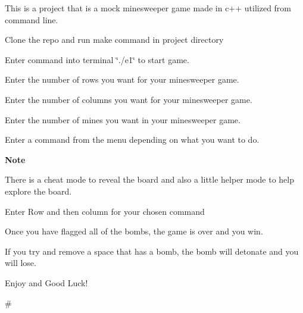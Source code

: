 This is a project that is a mock minesweeper game made in c++ utilized from command line.


\begin{DoxyEnumerate}
\item Clone the repo and run make command in project directory
\item Enter command into terminal \char`\"{}./e1\char`\"{} to start game.
\item Enter the number of rows you want for your minesweeper game.
\item Enter the number of columns you want for your minesweeper game.
\item Enter the number of mines you want in your minesweeper game.
\item Enter a command from the menu depending on what you want to do.
\end{DoxyEnumerate}

{\bfseries Note}

There is a cheat mode to reveal the board and also a little helper mode to help explore the board.


\begin{DoxyEnumerate}
\item Enter Row and then column for your chosen command
\item Once you have flagged all of the bombs, the game is over and you win.
\item If you try and remove a space that has a bomb, the bomb will detonate and you will lose.
\item Enjoy and Good Luck!
\end{DoxyEnumerate}

\# 